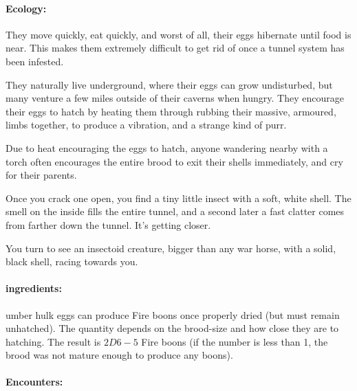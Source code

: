 \begin{multicols}{2}
\paragraph{Ecology:}
They move quickly, eat quickly, and worst of all, their eggs hibernate until food is near.
This makes them extremely difficult to get rid of once a tunnel system has been infested.

They naturally live underground, where their eggs can grow undisturbed, but many venture a few miles outside of their caverns when hungry.
They encourage their eggs to hatch by heating them through rubbing their massive, armoured, limbs together, to produce a vibration, and a strange kind of purr.

Due to heat encouraging the eggs to hatch, anyone wandering nearby with a torch often encourages the entire brood to exit their shells immediately, and cry for their parents.

\begin{boxtext}

  Once you crack one open, you find a tiny little insect with a soft, white shell.
  The smell on the inside fills the entire tunnel, and a second later a fast clatter comes from farther down the tunnel.
  It's getting closer.

  You turn to see an insectoid creature, bigger than any war horse, with a solid, black shell, racing towards you.

\end{boxtext}

\paragraph{\Glspl{ingredient}:}
umber hulk eggs can produce Fire \glspl{boon} once properly dried (but must remain unhatched).
The quantity depends on the brood-size and how close they are to hatching.
The result is $2D6-5$ Fire \glspl{boon} (if the number is less than 1, the brood was not mature enough to produce any \glspl{boon}).

\paragraph{Encounters:}


\end{multicols}
